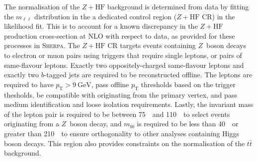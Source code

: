 The normalisation of the $Z+\text{HF}$ background is determined 
from data by fitting the $m_{\ell\ell}$ distribution in the  a dedicated control region 
($Z+\text{HF}$ CR) in the likelihood fit. 
This is to account for a known discrepancy in the $Z+\text{HF}$ production
cross-section at NLO with respect to data, as provided for these processes in \textsc{Sherpa}. 
The $Z+\text{HF}$ CR targets events containing $Z$~boson decays to electron or muon pairs 
using triggers that require single leptons, or pairs of same-flavour leptons. 
Exactly two oppositely-charged same-flavour leptons and exactly two $b$-tagged jets are required 
to be reconstructed offline. The leptons are required to have $p_\text{T}>9~\text{GeV}$, 
pass offline $p_\text{T}$ thresholds based on the trigger thesholds, 
be compatible with originating from the primary vertex, 
and pass medium identification and loose isolation requirements. 
Lastly, the invariant mass of the lepton pair is required to be between 75~\GeV\ 
and 110~\GeV\ to select events originating from a $Z$~boson decay, 
and $m_{bb}$ is required to be less than 40~\GeV\ or greater than 210~\GeV\ 
to ensure orthogonality to other analyses containing Higgs boson decays. 
This region also provides constraints on the normalisation of the $t\bar t$ background. 


